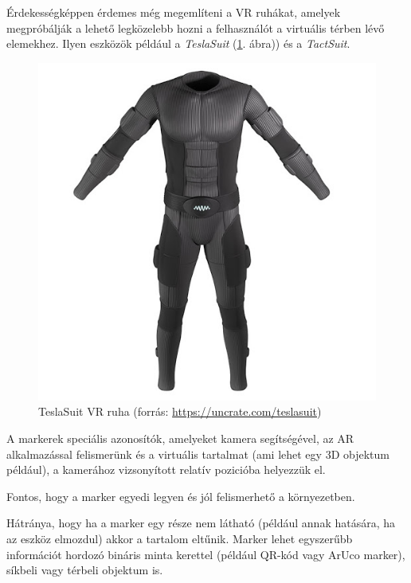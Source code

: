 Érdekességképpen érdemes még megemlíteni a VR ruhákat, amelyek megpróbálják a lehető legközelebb hozni a felhasználót a virtuális térben lévő elemekhez.
Ilyen eszközök például a \textit{TeslaSuit} (\ref{fig:teslasuit}. ábra)) és a \textit{TactSuit}.

\begin{figure}[htp]
    \centering
   	\includegraphics[scale=0.3]{images/tesla.jpg}
	\caption{TeslaSuit VR ruha (forrás: \url{https://uncrate.com/teslasuit})}
	\label{fig:teslasuit}
\end{figure}



A markerek speciális azonosítók, amelyeket kamera segítségével, az AR alkalmazással felismerünk és a virtuális tartalmat (ami lehet egy  3D objektum például), a kamerához vizsonyított relatív pozicióba helyezzük el. 

Fontos, hogy a marker egyedi legyen és jól felismerhető a környezetben. 

Hátránya, hogy ha a marker egy része nem látható (például annak hatására, ha az eszköz elmozdul) akkor a tartalom eltűnik.
Marker lehet egyszerűbb információt hordozó bináris minta kerettel (például QR-kód vagy ArUco marker), síkbeli vagy térbeli objektum is.

